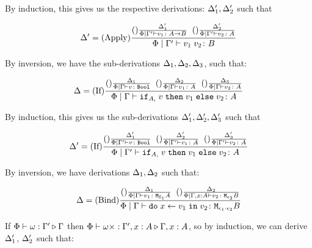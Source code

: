 {        By induction, this gives us the respective derivations: $\Delta_1',\Delta_2'$ such that

        
        \begin{equation}
            \Delta' = 
            (\text{Apply}) \frac{
                (\text{}) \frac{\Delta_1'}{\Phi\mid\Gamma' \vdash v_1 \colon A\rightarrow B}
                \;\;
                (\text{}) \frac{\Delta_2'}{\Phi\mid\Gamma' \vdash v_2 \colon A}
            }{
                \Phi\mid\Gamma' \vdash v_1\; v_2 \colon B
            }
        \end{equation}

    By inversion, we have the sub-derivations $\Delta_1,\Delta_2,\Delta_3$, such that:


    \begin{equation}
        \Delta = (\text{If}) \frac{
            (\text{}) \frac{\Delta_1}{\Phi\mid\Gamma \vdash v \colon \texttt{Bool}}
            \;\;
            (\text{}) \frac{\Delta_2}{\Phi\mid\Gamma \vdash v_1 \colon A}
            \;\;
            (\text{}) \frac{\Delta_3}{\Phi\mid\Gamma \vdash v_2 \colon A}
        }{
            \Phi\mid\Gamma \vdash \texttt{if}_{A, }\; v\; \texttt{then}\; v_1 \;\texttt{else} \; v_2 \colon A
        }
    \end{equation}

    By induction, this gives us the sub-derivations $\Delta_1', \Delta_2', \Delta_3'$ such that

    \begin{equation}
        \Delta' = (\text{If}) \frac{
            (\text{}) \frac{\Delta_1'}{\Phi\mid\Gamma' \vdash v \colon \texttt{Bool}}
            \;\;
            (\text{}) \frac{\Delta_2'}{\Phi\mid\Gamma' \vdash v_1 \colon A}
            \;\;
            (\text{}) \frac{\Delta_3'}{\Phi\mid\Gamma' \vdash v_2 \colon A}
        }{
            \Phi\mid\Gamma' \vdash \texttt{if}_{A, }\; v\; \texttt{then}\; v_1 \;\texttt{else} \; v_2 \colon A
        }
    \end{equation}
   
    By inversion, we have derivations $\Delta_1, \Delta_2$ such that:


    \begin{equation}
        \Delta = (\text{Bind}) \frac{
            (\text{}) \frac{\Delta_1}{\Phi\mid\Gamma \vdash v_1 \colon \texttt{M}_{\mathbb{E}_1}{A}}
            \;\;
            (\text{}) \frac{\Delta_2}{\Phi\mid\Gamma,x: A \vdash v_2 \colon \texttt{M}_{\epsilon_2}{B}}
        }{
            \Phi\mid\Gamma \vdash \texttt{do}\; x \leftarrow v_1 \;\texttt{in}\; v_2 \colon \texttt{M}_{\epsilon_1\cdot\epsilon_2}{B}
        }
    \end{equation}

    If $\Phi\vdash \omega : \Gamma' \triangleright \Gamma$ then $\Phi\vdash \omega\times : \Gamma',x:A \triangleright \Gamma, x: A$, so by induction, we can derive $\Delta_1'$, $\Delta_2'$ such that:

}
